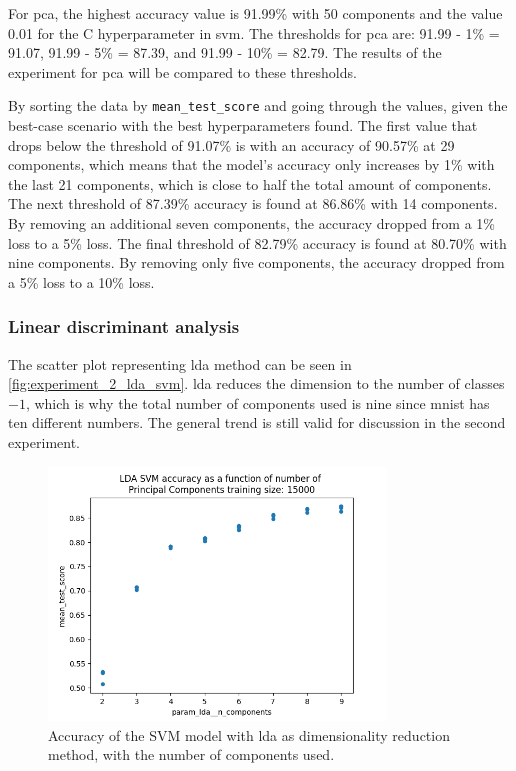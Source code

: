 For \gls{pca}, the highest accuracy value is 91.99\% with 50 components and the value 0.01 for the C hyperparameter in \gls{svm}. The thresholds for \gls{pca} are: 91.99 - 1\% = 91.07, 91.99 - 5\% = 87.39, and 91.99 - 10\% = 82.79. The results of the experiment for \gls{pca} will be compared to these thresholds.

By sorting the data by \texttt{mean\_test\_score} and going through the values, given the best-case scenario with the best hyperparameters found. The first value that drops below the threshold of 91.07\% is with an accuracy of 90.57\% at 29 components, which means that the model's accuracy only increases by 1\% with the last 21 components, which is close to half the total amount of components.
The next threshold of 87.39\% accuracy is found at 86.86\% with 14 components. By removing an additional seven components, the accuracy dropped from a 1\% loss to a 5\% loss.
The final threshold of 82.79\% accuracy is found at 80.70\% with nine components. By removing only five components, the accuracy dropped from a 5\% loss to a 10\% loss.

\subsubsection{Linear discriminant analysis}\label{subsubsec:experiment_2_lda}
The scatter plot representing \gls{lda} method can be seen in \autoref{fig:experiment_2_lda_svm}. \gls{lda} reduces the dimension to the number of classes $-1$, which is why the total number of components used is nine since \gls{mnist} has ten different numbers. The general trend is still valid for discussion in the second experiment.


\begin{figure}[htb!]
    \centering
    \includegraphics[width=0.8\textwidth]{figures/experiment_two/lda_svm_15000.png}
    \caption{Accuracy of the SVM model with \gls{lda} as dimensionality reduction method, with the number of components used.}
    \label{fig:experiment_2_lda_svm}
\end{figure}

